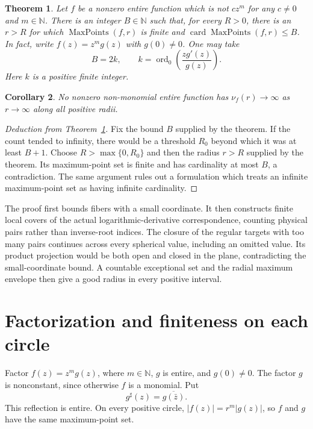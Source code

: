 \documentclass[11pt]{article}
\newtheorem{theorem}{Theorem}
\newtheorem{corollary}[theorem]{Corollary}
\numberwithin{equation}{section}
\newcommand{\N}{\mathbb N}
\newcommand{\Max}{\operatorname{MaxPoints}}
\newcommand{\card}{\operatorname{card}}
\newcommand{\ord}{\operatorname{ord}}
\begin{document}
\begin{theorem}\label{thm:main}
Let $f$ be a nonzero entire function which is not $cz^m$ for any
$c\ne0$ and $m\in\N$. There is an integer $B\in\N$ such that, for every
$R>0$, there is an $r>R$ for which $\Max(f,r)$ is finite and
$\card\Max(f,r)\le B$.
In fact, write $f(z)=z^m g(z)$ with $g(0)\ne0$. One may take
\[
 B=2k,\qquad k=\ord_0\left(\frac{zg'(z)}{g(z)}\right).
\]
Here $k$ is a positive finite integer.
\end{theorem}

\begin{corollary}\label{cor:negative}
No nonzero non-monomial entire function has
$\nu_f(r)\to\infty$ as $r\to\infty$ along all positive radii.
\end{corollary}

\begin{proof}[Deduction from Theorem~\ref{thm:main}]
Fix the bound $B$ supplied by the theorem. If the count tended to infinity,
there would be a threshold $R_0$ beyond which it was at least $B+1$.
Choose $R>\max\{0,R_0\}$ and then the radius $r>R$ supplied by the theorem.
Its maximum-point set is finite and has cardinality at most $B$, a
contradiction. The same argument rules out a formulation which treats an
infinite maximum-point set as having infinite cardinality.
\end{proof}

The proof first bounds fibers with a small coordinate. It then constructs
finite local covers of the actual logarithmic-derivative correspondence,
counting physical pairs rather than inverse-root indices. The closure of
the regular targets with too many pairs continues across every spherical
value, including an omitted value. Its product projection would be both
open and closed in the plane, contradicting the small-coordinate bound.
A countable exceptional set and the radial maximum envelope then give a
good radius in every positive interval.

\section{Factorization and finiteness on each circle}\label{sec:finiteness}

Factor $f(z)=z^m g(z)$, where $m\in\N$, $g$ is entire, and $g(0)\ne0$.
The factor $g$ is nonconstant, since otherwise $f$ is a monomial. Put
\[
 g^\sharp(z)=\overline{g(\bar z)}.
\]
This reflection is entire. On every positive circle,
$|f(z)|=r^m|g(z)|$, so $f$ and $g$ have the same maximum-point set.
\end{document}
